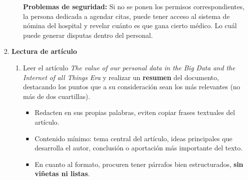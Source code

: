 \documentclass[12pt]{report}
\begin{document}
\begin{enumerate}[label=\textbf{\arabic*.}, leftmargin=*]
\begin{enumerate}[label=\textbf{\alph*.}, leftmargin=*, itemsep=1.0em]
    \textbf{Problemas de seguridad:}
    Si no se ponen los permisos correspondientes, la persona dedicada a agendar citas, puede tener acceso al sistema de nómina del hospital y revelar cuánto es que gana cierto médico. Lo cuál puede generar disputas dentro del personal.

\end{enumerate}
\newpage
\item \textbf{Lectura de art\'iculo}

\begin{enumerate}[label=\textbf{\alph*.}, leftmargin=*, itemsep=1.0em]

\item Leer el art\'iculo \textit{The value of our personal data in the Big Data and the Internet of all Things Era} y realizar un \textbf{resumen} del documento, destacando los puntos que a su consideraci\'on sean los m\'as relevantes (no m\'as de dos cuartillas).
\begin{itemize}
  \item Redacten en sus propias palabras, eviten copiar frases textuales del art\'iculo.
  \item Contenido m\'inimo: tema central del art\'iculo, ideas principales que desarrolla el autor, conclusi\'on o aportaci\'on m\'as importante del texto.
  \item En cuanto al formato, procuren tener p\'arrafos bien estructurados, \textbf{sin vi\~netas ni listas}.
\end{itemize}


\end{enumerate}
\end{enumerate}
\end{document}
